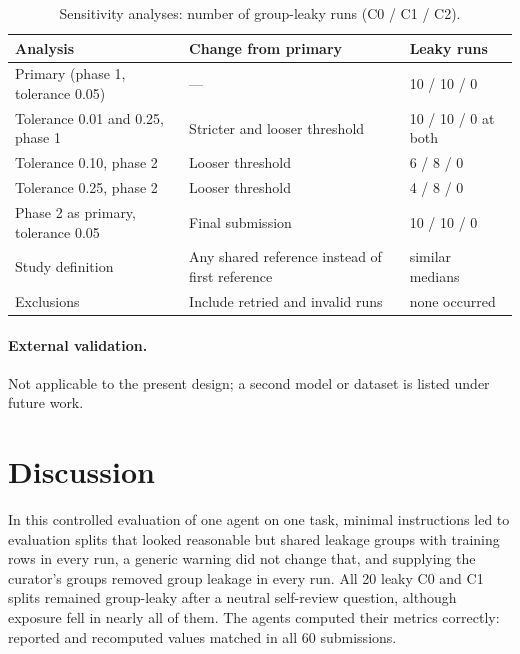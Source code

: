 \documentclass[11pt,a4paper]{article}
\begin{document}
\begin{table}[ht]
\centering
\caption{Sensitivity analyses: number of group-leaky runs (C0 / C1 / C2).}
\label{tab:sens}
\small
\begin{tabularx}{\textwidth}{@{}lXl@{}}
\toprule
Analysis & Change from primary & Leaky runs\\
\midrule
Primary (phase 1, tolerance 0.05) & --- & 10 / 10 / 0\\
Tolerance 0.01 and 0.25, phase 1 & Stricter and looser threshold & 10 / 10 / 0 at both\\
Tolerance 0.10, phase 2 & Looser threshold & 6 / 8 / 0\\
Tolerance 0.25, phase 2 & Looser threshold & 4 / 8 / 0\\
Phase 2 as primary, tolerance 0.05 & Final submission & 10 / 10 / 0\\
Study definition & Any shared reference instead of first reference & similar medians\\
Exclusions & Include retried and invalid runs & none occurred\\
\bottomrule
\end{tabularx}
\end{table}

\paragraph{External validation.} Not applicable to the present design; a second model or dataset is listed under future work.






\section*{Discussion}
In this controlled evaluation of one agent on one task, minimal instructions led to evaluation splits that looked reasonable but shared leakage groups with training rows in every run, a generic warning did not change that, and supplying the curator's groups removed group leakage in every run. All 20 leaky C0 and C1 splits remained group-leaky after a neutral self-review question, although exposure fell in nearly all of them. The agents computed their metrics correctly: reported and recomputed values matched in all 60 submissions.
\end{document}
